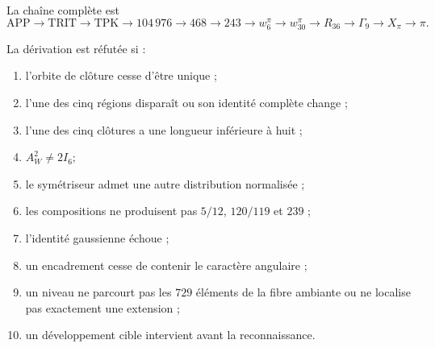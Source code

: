 La chaîne complète est
\[
 \mathrm{APP}\to\mathrm{TRIT}\to\mathrm{TPK}
 \to104\,976\to468\to243\to w_6^\pi
 \to w_{30}^\pi\to R_{36}\to\Gamma_9
 \to X_\pi\to\pi.
\]

\begin{remark}
La dérivation est réfutée si :
\begin{enumerate}
 \item l’orbite de clôture cesse d’être unique ;
 \item l’une des cinq régions disparaît ou son identité complète change ;
 \item l’une des cinq clôtures a une longueur inférieure à huit ;
 \item \(A_W^2\ne2I_6\);
 \item le symétriseur admet une autre distribution normalisée ;
 \item les compositions ne produisent pas \(5/12\), \(120/119\) et \(239\) ;
 \item l’identité gaussienne échoue ;
 \item un encadrement cesse de contenir le caractère angulaire ;
 \item un niveau ne parcourt pas les \(729\) éléments de la fibre ambiante ou ne
       localise pas exactement une extension ;
 \item un développement cible intervient avant la reconnaissance.
\end{enumerate}
\end{remark}
